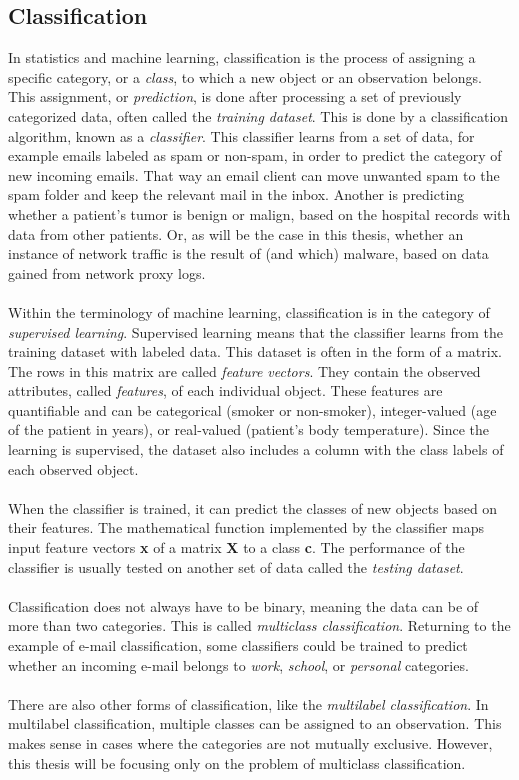\documentclass[11pt]{article}
\begin{document}
    \subsection{Classification}
      In statistics and machine learning, classification is the process of assigning a specific category, or a {\it class}, to which a new object or an observation belongs. This assignment, or {\it prediction}, is done after processing a set of previously categorized data, often called the {\it training dataset}. This is done by a classification algorithm, known as a {\it classifier}. This classifier learns from a set of data, for example emails labeled as spam or non-spam, in order to predict the category of new incoming emails. That way an email client can move unwanted spam to the spam folder and keep the relevant mail in the inbox. Another is predicting whether a patient's tumor is benign or malign, based on the hospital records with data from other patients. Or, as will be the case in this thesis, whether an instance of network traffic is the result of (and which) malware, based on data gained from network proxy logs.
      \\~\\
      Within the terminology of machine learning, classification is in the category of {\it supervised learning}. \citep{mlintro} Supervised learning means that the classifier learns from the training dataset with labeled data. This dataset is often in the form of a matrix. The rows in this matrix are called {\it feature vectors}. They contain the observed attributes, called {\it features}, of each individual object. These features are quantifiable and can be categorical (smoker or non-smoker), integer-valued (age of the patient in years), or real-valued (patient's body temperature). Since the learning is supervised, the dataset also includes a column with the class labels of each observed object.
      \\~\\
      When the classifier is trained, it can predict the classes of new objects based on their features. The mathematical function implemented by the classifier maps input feature vectors {\bf x} of a matrix {\bf X} to a class {\bf c}. The performance of the classifier is usually tested on another set of data called the {\it testing dataset}.
      \\~\\
      Classification does not always have to be binary, meaning the data can be of more than two categories. This is called {\it multiclass classification}. Returning to the example of e-mail classification, some classifiers could be trained to predict whether an incoming e-mail belongs to {\it work}, {\it school}, or {\it personal} categories.
      \\~\\
      There are also other forms of classification, like the {\it multilabel classification}. In multilabel classification, multiple classes can be assigned to an observation. This makes sense in cases where the categories are not mutually exclusive. However, this thesis will be focusing only on the problem of multiclass classification.
\end{document}
